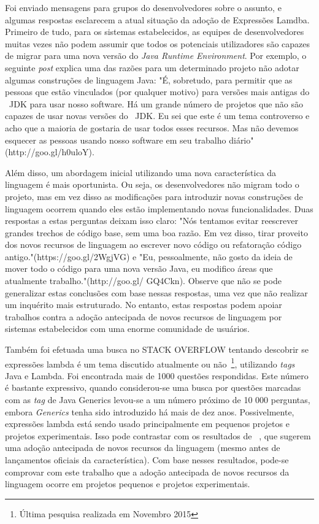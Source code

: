 Foi enviado mensagens para grupos do desenvolvedores sobre o assunto, e algumas respostas esclarecem a atual situação da adoção de Expressões Lamdba. Primeiro de tudo, para os sistemas estabelecidos, as equipes de desenvolvedores muitas vezes não podem assumir que todos os potenciais utilizadores são capazes de migrar para uma nova versão do \textit{Java Runtime Environment}. Por exemplo, o seguinte \textit{post} explica uma das razões para um determinado projeto não adotar algumas construções de linguagem Java: "É, sobretudo, para permitir que as pessoas que estão vinculados (por qualquer motivo) para versões mais antigas do ~\acs{JDK} para usar nosso software. Há um grande número de projetos que não são capazes de usar novas versões do ~\acs{JDK}. Eu sei que este é um tema controverso e acho que a maioria de gostaria de usar todos esses recursos. Mas não devemos esquecer as pessoas usando nosso software em seu trabalho diário" (http://goo.gl/h0uloY).

Além disso, um abordagem inicial utilizando uma nova característica da linguagem é mais oportunista. Ou seja, os desenvolvedores não migram todo o projeto, mas em vez disso as modificações para introduzir novas construções de linguagem ocorrem quando eles estão implementando novas funcionalidades. Duas respostas a estas perguntas deixam isso claro: "Nós tentamos evitar reescrever grandes trechos de código base, sem uma boa razão. Em vez disso, tirar proveito dos novos recursos de linguagem ao escrever novo código ou refatoração código antigo."(https://goo.gl/2WgjVG) e "Eu, pessoalmente, não gosto da ideia de mover todo o código para uma nova versão Java, eu modifico áreas que atualmente trabalho."(http://goo.gl/ GQ4Ckn). Observe que não se pode generalizar estas conclusões com base nessas respostas, uma vez que não realizar um inquérito mais estruturado. No entanto, estas respostas podem apoiar trabalhos contra a adoção antecipada de novos recursos de linguagem por sistemas estabelecidos com uma enorme comunidade de usuários.


Também foi efetuada uma busca no STACK OVERFLOW tentando descobrir se expressões lambda é um tema discutido atualmente ou não~\footnote{Última pesquisa realizada em Novembro 2015}, utilizando \textit{tags} Java e Lambda. Foi encontrada mais de 1000 questões respondidas. Este número é bastante expressivo, quando considerou-se uma busca por questões marcadas com as \textit{tag} de Java Generics levou-se a um número próximo de 10 000 perguntas, embora \textit{Generics} tenha sido introduzido há mais de dez anos. Possivelmente, expressões lambda está sendo usado principalmente em pequenos projetos e projetos experimentais. Isso pode contrastar com os resultados de ~\cite{Dyer:ACM2014}, que sugerem uma adoção antecipada de novos recursos da linguagem (mesmo antes de lançamentos oficiais da característica). Com base nesses resultados, pode-se comprovar com este trabalho que a adoção antecipada de novos recursos da linguagem ocorre em projetos pequenos e projetos experimentais.

